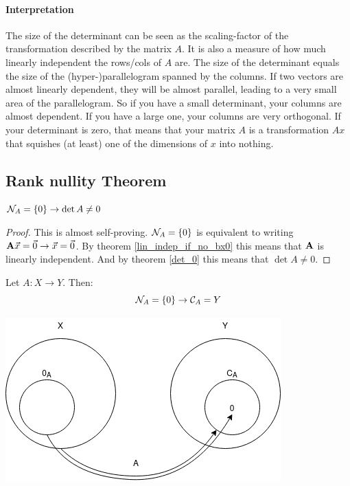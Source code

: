 \paragraph{Interpretation} The size of the determinant can be seen as the scaling-factor of the transformation described by the matrix $A$.
It is also a measure of how much linearly independent the rows/cols of $A$ are. The size of the determinant equals the size of the (hyper-)parallelogram spanned by the columns. If two vectors are almost linearly dependent, they will be almost parallel, leading to a very small area of the parallelogram. So if you have a small determinant, your columns are almost dependent. If you have a large one, your columns are very orthogonal. 
If your determinant is zero, that means that your matrix $A$ is a transformation $Ax$ that squishes (at least) one of the dimensions of $x$ into nothing.












\subsection{Rank nullity Theorem}


\begin{theorem}
    $ \mathcal{N}_{A} = \{ 0 \} \to \det{A} \neq 0 $
\end{theorem}
\begin{proof}
    This is almost self-proving. 
    $\mathcal{N}_{A} = \{ 0 \}$ is equivalent to writing $\mathbf{A} \vec{x} = \vec{0} \to \vec{x} = \vec{0}$.
    By theorem \ref{lin_indep_if_no_bx0} this means that $\mathbf{A}$ is linearly independent.
    And by theorem \ref{det_0} this means that $ \det{A} \neq 0 $.
\end{proof}


\begin{theorem}
    Let $A: X \to Y$. Then:
    $$ \mathcal{N}_{A} = \{ 0 \} \to \mathcal{C}_{A} = Y $$
\end{theorem}

\includegraphics[width=0.4\linewidth]{images/A_from_X_to_Y.png}

